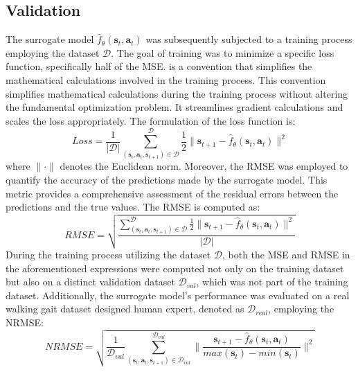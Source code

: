 \subsection{Validation}
The surrogate model $\hat{f}_\theta(\mathbf{s}_t, \mathbf{a}_t)$ was subsequently subjected to a training process employing the dataset $\mathcal{D}$. The goal of training was to minimize a specific loss function, specifically half of the \ac{MSE}. is a convention that simplifies the mathematical calculations involved in the training process. This convention simplifies mathematical calculations during the training process without altering the fundamental optimization problem. It streamlines gradient calculations and scales the loss appropriately. The formulation of the loss function is: 
\begin{equation}
    Loss = \frac{1}{|\mathcal{D}|}\sum_{(\mathbf{s}_t,\mathbf{a}_t, \mathbf{s}_{t+1}) \in \mathcal{D}}^\mathcal{D} \frac{1}{2}\lVert \mathbf{s}_{t+1}-\hat{f}_\theta(\mathbf{s}_t, \mathbf{a}_t)\rVert^2
\label{eq:loss}
\end{equation}
where $\lVert\cdot\rVert$ denotes the Euclidean norm. Moreover, the \ac{RMSE} was employed to quantify the accuracy of the predictions made by the surrogate model. This metric provides a comprehensive assessment of the residual errors between the predictions and the true values. The \ac{RMSE} is computed as: 
\begin{equation}
    RMSE = \sqrt{\frac{\sum_{(\mathbf{s}_t,\mathbf{a}_t, \mathbf{s}_{t+1}) \in \mathcal{D}}^\mathcal{D} \frac{1}{2}\lVert \mathbf{s}_{t+1}-\hat{f}_\theta(\mathbf{s}_t, \mathbf{a}_t)\rVert^2}{|\mathcal{D}|}}
    \label{eq:RMSE}
\end{equation}
During the training process utilizing the dataset $\mathcal{D}$, both the \ac{MSE} and \ac{RMSE} in the aforementioned expressions were computed not only on the training dataset but also on a distinct validation dataset $\mathcal{D}_{val}$, which was not part of the training dataset. Additionally, the surrogate model's performance was evaluated on a real walking gait dataset designed human expert, denoted as $\mathcal{D}_{real}$, employing the \ac{NRMSE}:
\begin{equation}
    NRMSE = \sqrt{\frac{1}{\mathcal{D}_{val}}\sum_{(\mathbf{s}_t,\mathbf{a}_t, \mathbf{s}_{t+1}) \in \mathcal{D}_{val}}^{\mathcal{D}_{val}} \lVert \frac{\mathbf{s}_{t+1}-\hat{f}_\theta(\mathbf{s}_t, \mathbf{a}_t)}{max(\mathbf{s}_t) - min(\mathbf{s}_t)}\rVert^2}
    \label{eq:NRMSE}
\end{equation}

